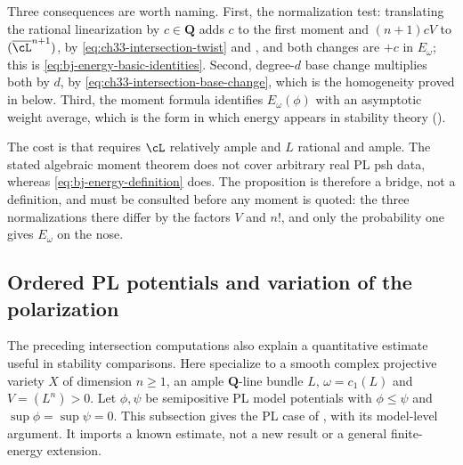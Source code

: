 \begin{remark}
\label{rem:ch46-dh-scope}
Three consequences are worth naming.  First, the normalization test:
translating the rational linearization by $c\in\mathbf Q$ adds $c$ to the first moment and
$(n+1)cV$ to $(\overline\cL^{n+1})$, by
\eqref{eq:ch33-intersection-twist} and
, and both changes are $+c$ in
$E_\omega$; this is \eqref{eq:bj-energy-basic-identities}.  Second,
degree-$d$ base change multiplies both by $d$, by
\eqref{eq:ch33-intersection-base-change}, which is the homogeneity proved
in  below.  Third, the moment formula
identifies $E_\omega(\phi)$ with an asymptotic weight average, which is
the form in which energy appears in stability theory
().

The cost is that  requires $\cL$ relatively
ample and $L$ rational and ample. The stated algebraic moment theorem
does not cover arbitrary real PL psh data, whereas
\eqref{eq:bj-energy-definition} does. The
proposition is therefore a bridge, not a definition, and
 must be consulted before any moment is
quoted: the three normalizations there differ by the factors $V$ and
$n!$, and only the probability one gives $E_\omega$ on the nose.
\end{remark}

\subsection{Ordered PL potentials and variation of the polarization}
\label{sec:ch46-ordered-polarization}

The preceding intersection computations also explain a quantitative
estimate useful in stability comparisons. Here specialize to a smooth
complex projective variety $X$ of dimension $n\geq1$, an ample
$\mathbf Q$-line bundle $L$, $\omega=c_1(L)$ and $V=(L^n)>0$.
Let $\phi,\psi$ be semipositive PL model potentials with
$\phi\leq\psi$ and $\sup\phi=\sup\psi=0$. This subsection gives
the PL case of \cite[Theorem~3.5]{Papazachariou26KhatKbetaV1},
with its model-level argument. It imports a known estimate, not a new
result or a general finite-energy extension.

